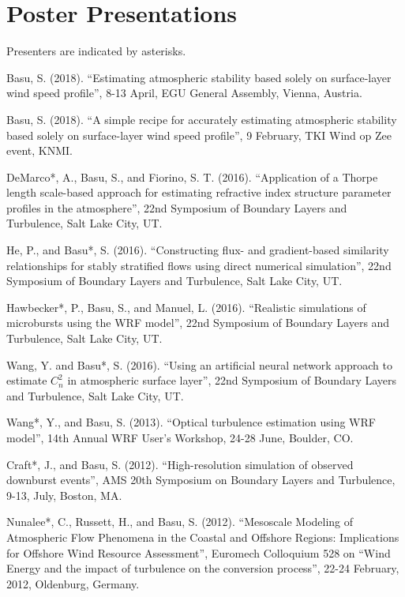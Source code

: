 \section*{Poster Presentations}
Presenters are indicated by asterisks.\\ 

\normalsize

\begin{etaremune}[topsep=0pt,itemsep=0pt,partopsep=0pt,parsep=0pt]

\item Basu, S. (2018). ``Estimating atmospheric stability based solely on surface-layer wind speed profile'', 8-13 April, EGU General Assembly, Vienna, Austria. 
\item Basu, S. (2018). ``A simple recipe for accurately estimating atmospheric stability based solely on surface-layer wind speed profile'', 9 February, TKI Wind op Zee event, KNMI.
\item DeMarco*, A., Basu, S., and Fiorino, S. T. (2016). ``Application of a Thorpe length scale-based approach for estimating refractive index structure parameter profiles in the atmosphere'', 22nd Symposium of Boundary Layers and Turbulence, Salt Lake City, UT. 
\item He, P., and Basu*, S. (2016). ``Constructing flux- and gradient-based similarity relationships for stably stratified flows using direct numerical simulation'', 22nd Symposium of Boundary Layers and Turbulence, Salt Lake City, UT.
\item Hawbecker*, P., Basu, S., and Manuel, L. (2016). ``Realistic simulations of microbursts using the WRF model'', 22nd Symposium of Boundary Layers and Turbulence, Salt Lake City, UT.
\item Wang, Y. and Basu*, S. (2016). ``Using an artificial neural network approach to estimate $C_n^2$ in atmospheric surface layer'', 22nd Symposium of Boundary Layers and Turbulence, Salt Lake City, UT. 
\item Wang*, Y., and Basu, S. (2013). ``Optical turbulence estimation using WRF model'', 14th Annual WRF User's Workshop, 24-28 June, Boulder, CO.
\item Craft*, J., and Basu, S. (2012). ``High-resolution simulation of observed downburst events'', AMS 20th Symposium on Boundary Layers and Turbulence, 9-13, July, Boston, MA.
\item Nunalee*, C., Russett, H., and Basu, S. (2012). ``Mesoscale Modeling of Atmospheric Flow Phenomena in the Coastal and Offshore Regions: Implications for Offshore Wind Resource Assessment'', Euromech Colloquium 528 on ``Wind Energy and the impact of turbulence on the conversion process'', 22-24 February, 2012, Oldenburg, Germany.

\end{etaremune}
